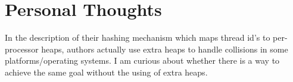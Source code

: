 \documentclass[10pt, letterpaper]{article}
\begin{document}
\section{Personal Thoughts}
\label{sec-thoughts}
In the description of their hashing mechanism which maps thread id's to per-processor heaps, authors actually use extra heaps to handle collisions in some platforms/operating systems. I am curious about whether there is a way to achieve the same goal without the using of extra heaps.



\end{document}
